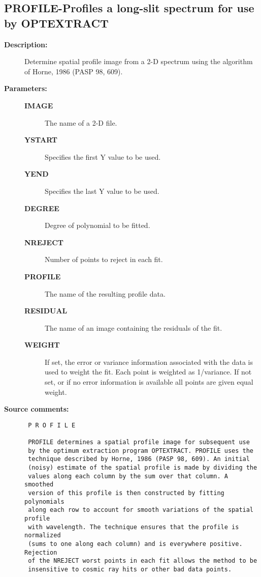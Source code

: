 \subsection{PROFILE-\label{PROFILE}Profiles a long-slit spectrum for use by OPTEXTRACT}
\begin{description}

\item [{\bf Description:}]
 Determine spatial profile image from a 2-D spectrum using the
 algorithm of Horne, 1986 (PASP 98, 609).

\item [{\bf Parameters:}]
\begin{description}
\item [{\bf IMAGE}]
 The name of a 2-D file.
\item [{\bf YSTART}]
 Specifies the first Y value to be used.
\item [{\bf YEND}]
 Specifies the last Y value to be used.
\item [{\bf DEGREE}]
 Degree of polynomial to be fitted.
\item [{\bf NREJECT}]
 Number of points to reject in each fit.
\item [{\bf PROFILE}]
 The name of the resulting profile data.
\item [{\bf RESIDUAL}]
 The name of an image containing the residuals of the fit.
\item [{\bf WEIGHT}]
 If set, the error or variance information associated with
 the data is used to weight the fit.  Each point is weighted
 as 1/variance.  If not set, or if no error information is
 available all points are given equal weight.
\end{description}

\item [{\bf Source comments:}]
\begin{verbatim}
 P R O F I L E

 PROFILE determines a spatial profile image for subsequent use
 by the optimum extraction program OPTEXTRACT. PROFILE uses the
 technique described by Horne, 1986 (PASP 98, 609). An initial
 (noisy) estimate of the spatial profile is made by dividing the
 values along each column by the sum over that column. A smoothed
 version of this profile is then constructed by fitting polynomials
 along each row to account for smooth variations of the spatial profile
 with wavelength. The technique ensures that the profile is normalized
 (sums to one along each column) and is everywhere positive. Rejection
 of the NREJECT worst points in each fit allows the method to be
 insensitive to cosmic ray hits or other bad data points.


\end{verbatim}
\end{description}
